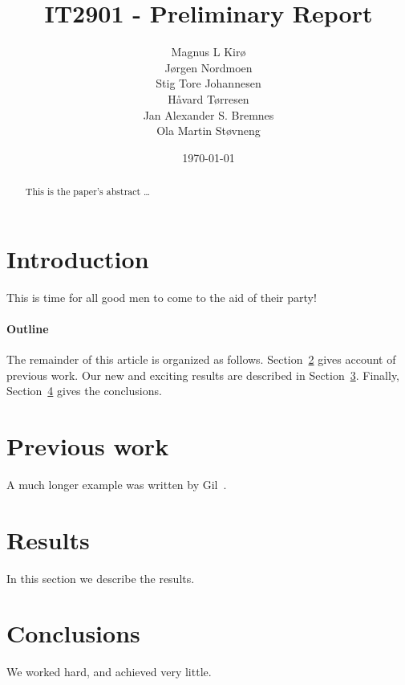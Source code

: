 \documentclass[12pt]{article}
\title{IT2901 - Preliminary Report}
\author{
        Magnus L Kirø \\
        Jørgen Nordmoen \\
        Stig Tore Johannesen \\
        Håvard Tørresen \\
        Jan Alexander S. Bremnes \\
        Ola Martin Støvneng 
}
\date{\today}
\begin{document}
\maketitle
\titlepage
{}

\begin{abstract}
This is the paper's abstract \ldots
\end{abstract}

\section{Introduction}
This is time for all good men to come to the aid of their party!

\paragraph{Outline}
The remainder of this article is organized as follows.
Section~\ref{previous work} gives account of previous work.
Our new and exciting results are described in Section~\ref{results}.
Finally, Section~\ref{conclusions} gives the conclusions.

\section{Previous work}\label{previous work}
A much longer \LaTeXe{} example was written by Gil~\cite{Gil:02}.

\section{Results}\label{results}
In this section we describe the results.

\section{Conclusions}\label{conclusions}
We worked hard, and achieved very little.



\end{document}
